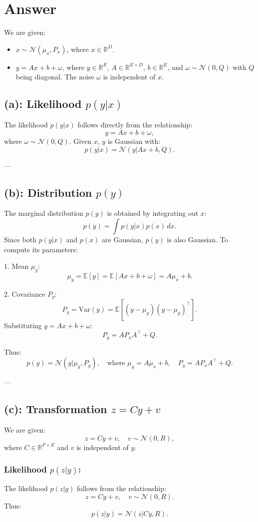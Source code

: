 \documentclass[12pt]{article}
\begin{document}
\section*{Answer}
We are given:
\begin{itemize}
    \item $x \sim \mathcal{N}(\mu_x, P_x)$, where $x \in \mathbb{R}^D$.
    \item $y = A x + b + \omega$, where $y \in \mathbb{R}^E$, $A \in \mathbb{R}^{E \times D}$, $b \in \mathbb{R}^E$, and $\omega \sim \mathcal{N}(0, Q)$ with $Q$ being diagonal. The noise $\omega$ is independent of $x$.
\end{itemize}

\subsection*{(a): Likelihood $p(y|x)$}
The likelihood $p(y|x)$ follows directly from the relationship:
\[
y = A x + b + \omega,
\]
where $\omega \sim \mathcal{N}(0, Q)$. Given $x$, $y$ is Gaussian with:
\[
p(y|x) = \mathcal{N}(y | A x + b, Q).
\]

---

\subsection*{(b): Distribution $p(y)$}
The marginal distribution $p(y)$ is obtained by integrating out $x$:
\[
p(y) = \int p(y|x)p(x) \, dx.
\]
Since both $p(y|x)$ and $p(x)$ are Gaussian, $p(y)$ is also Gaussian. To compute its parameters:

1. Mean $\mu_y$:
\[
\mu_y = \mathbb{E}[y] = \mathbb{E}[A x + b + \omega] = A \mu_x + b.
\]

2. Covariance $P_y$:
\[
P_y = \text{Var}(y) = \mathbb{E}[(y - \mu_y)(y - \mu_y)^\top].
\]
Substituting $y = A x + b + \omega$:
\[
P_y = A P_x A^\top + Q.
\]

Thus:
\[
p(y) = \mathcal{N}(y | \mu_y, P_y), \quad \text{where } \mu_y = A \mu_x + b, \quad P_y = A P_x A^\top + Q.
\]

---

\subsection*{(c): Transformation $z = C y + v$}
We are given:
\[
z = C y + v, \quad v \sim \mathcal{N}(0, R),
\]
where $C \in \mathbb{R}^{F \times E}$ and $v$ is independent of $y$. 

\subsubsection*{Likelihood $p(z|y)$:}
The likelihood $p(z|y)$ follows from the relationship:
\[
z = C y + v, \quad v \sim \mathcal{N}(0, R).
\]
Thus:
\[
p(z|y) = \mathcal{N}(z | C y, R).
\]
\end{document}
